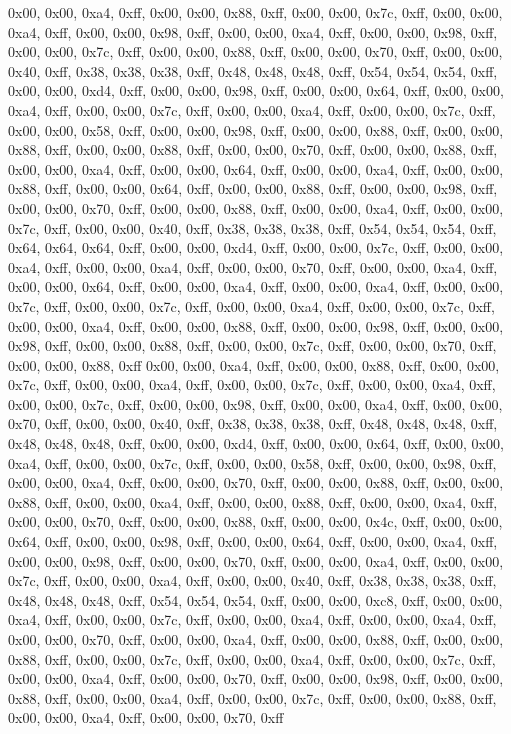 0x00, 0x00, 0xa4, 0xff, 0x00, 0x00, 0x88, 0xff, 0x00, 0x00, 0x7c, 0xff, 0x00, 0x00, 0xa4, 0xff, 0x00, 0x00, 0x98, 0xff, 0x00, 0x00, 0xa4, 0xff, 0x00, 0x00, 0x98, 0xff, 0x00, 0x00, 0x7c, 0xff, 0x00, 0x00, 0x88, 0xff, 0x00, 0x00, 0x70, 0xff, 0x00, 0x00, 0x40, 0xff, 0x38, 0x38, 0x38, 0xff, 0x48, 0x48, 0x48, 0xff, 0x54, 0x54, 0x54, 0xff, 0x00, 0x00, 0xd4, 0xff, 0x00, 0x00, 0x98, 0xff, 0x00, 0x00, 0x64, 0xff, 0x00, 0x00, 0xa4, 0xff, 0x00, 0x00, 0x7c, 0xff, 0x00, 0x00, 0xa4, 0xff, 0x00, 0x00, 0x7c, 0xff, 0x00, 0x00, 0x58, 0xff, 0x00, 0x00, 0x98, 0xff, 0x00, 0x00, 0x88, 0xff, 0x00, 0x00, 0x88, 0xff, 0x00, 0x00, 0x88, 0xff, 0x00, 0x00, 0x70, 0xff, 0x00, 0x00, 0x88, 0xff, 0x00, 0x00, 0xa4, 0xff, 0x00, 0x00, 0x64, 0xff, 0x00, 0x00, 0xa4, 0xff, 0x00, 0x00, 0x88, 0xff, 0x00, 0x00, 0x64, 0xff, 0x00, 0x00, 0x88, 0xff, 0x00, 0x00, 0x98, 0xff, 0x00, 0x00, 0x70, 0xff, 0x00, 0x00, 0x88, 0xff, 0x00, 0x00, 0xa4, 0xff, 0x00, 0x00, 0x7c, 0xff, 0x00, 0x00, 0x40, 0xff, 0x38, 0x38, 0x38, 0xff, 0x54, 0x54, 0x54, 0xff, 0x64, 0x64, 0x64, 0xff, 0x00, 0x00, 0xd4, 0xff, 0x00, 0x00, 0x7c, 0xff, 0x00, 0x00, 0xa4, 0xff, 0x00, 0x00, 0xa4, 0xff, 0x00, 0x00, 0x70, 0xff, 0x00, 0x00, 0xa4, 0xff, 0x00, 0x00, 0x64, 0xff, 0x00, 0x00, 0xa4, 0xff, 0x00, 0x00, 0xa4, 0xff, 0x00, 0x00, 0x7c, 0xff, 0x00, 0x00, 0x7c, 0xff, 0x00, 0x00, 0xa4, 0xff, 0x00, 0x00, 0x7c, 0xff, 0x00, 0x00, 0xa4, 0xff, 0x00, 0x00, 0x88, 0xff, 0x00, 0x00, 0x98, 0xff, 0x00, 0x00, 0x98, 0xff, 0x00, 0x00, 0x88, 0xff, 0x00, 0x00, 0x7c, 0xff, 0x00, 0x00, 0x70, 0xff, 0x00, 0x00, 0x88, 0xff
0x00, 0x00, 0xa4, 0xff, 0x00, 0x00, 0x88, 0xff, 0x00, 0x00, 0x7c, 0xff, 0x00, 0x00, 0xa4, 0xff, 0x00, 0x00, 0x7c, 0xff, 0x00, 0x00, 0xa4, 0xff, 0x00, 0x00, 0x7c, 0xff, 0x00, 0x00, 0x98, 0xff, 0x00, 0x00, 0xa4, 0xff, 0x00, 0x00, 0x70, 0xff, 0x00, 0x00, 0x40, 0xff, 0x38, 0x38, 0x38, 0xff, 0x48, 0x48, 0x48, 0xff, 0x48, 0x48, 0x48, 0xff, 0x00, 0x00, 0xd4, 0xff, 0x00, 0x00, 0x64, 0xff, 0x00, 0x00, 0xa4, 0xff, 0x00, 0x00, 0x7c, 0xff, 0x00, 0x00, 0x58, 0xff, 0x00, 0x00, 0x98, 0xff, 0x00, 0x00, 0xa4, 0xff, 0x00, 0x00, 0x70, 0xff, 0x00, 0x00, 0x88, 0xff, 0x00, 0x00, 0x88, 0xff, 0x00, 0x00, 0xa4, 0xff, 0x00, 0x00, 0x88, 0xff, 0x00, 0x00, 0xa4, 0xff, 0x00, 0x00, 0x70, 0xff, 0x00, 0x00, 0x88, 0xff, 0x00, 0x00, 0x4c, 0xff, 0x00, 0x00, 0x64, 0xff, 0x00, 0x00, 0x98, 0xff, 0x00, 0x00, 0x64, 0xff, 0x00, 0x00, 0xa4, 0xff, 0x00, 0x00, 0x98, 0xff, 0x00, 0x00, 0x70, 0xff, 0x00, 0x00, 0xa4, 0xff, 0x00, 0x00, 0x7c, 0xff, 0x00, 0x00, 0xa4, 0xff, 0x00, 0x00, 0x40, 0xff, 0x38, 0x38, 0x38, 0xff, 0x48, 0x48, 0x48, 0xff, 0x54, 0x54, 0x54, 0xff, 0x00, 0x00, 0xc8, 0xff, 0x00, 0x00, 0xa4, 0xff, 0x00, 0x00, 0x7c, 0xff, 0x00, 0x00, 0xa4, 0xff, 0x00, 0x00, 0xa4, 0xff, 0x00, 0x00, 0x70, 0xff, 0x00, 0x00, 0xa4, 0xff, 0x00, 0x00, 0x88, 0xff, 0x00, 0x00, 0x88, 0xff, 0x00, 0x00, 0x7c, 0xff, 0x00, 0x00, 0xa4, 0xff, 0x00, 0x00, 0x7c, 0xff, 0x00, 0x00, 0xa4, 0xff, 0x00, 0x00, 0x70, 0xff, 0x00, 0x00, 0x98, 0xff, 0x00, 0x00, 0x88, 0xff, 0x00, 0x00, 0xa4, 0xff, 0x00, 0x00, 0x7c, 0xff, 0x00, 0x00, 0x88, 0xff, 0x00, 0x00, 0xa4, 0xff, 0x00, 0x00, 0x70, 0xff

